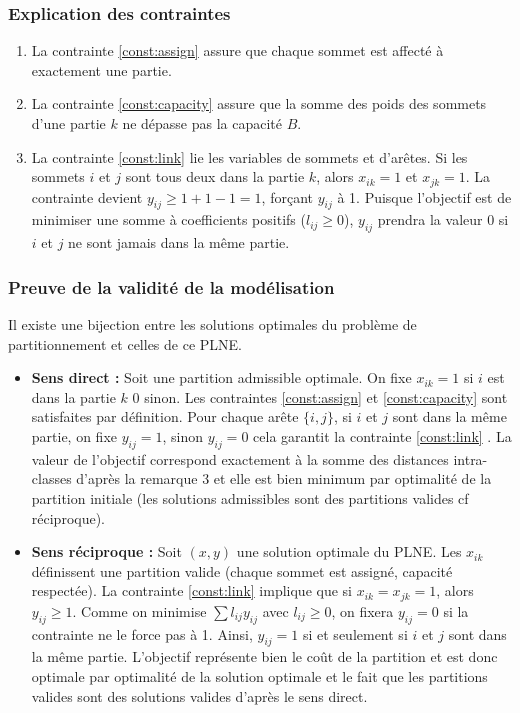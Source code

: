 \documentclass{article}
\begin{document}
\subsubsection*{Explication des contraintes}
\begin{enumerate}
    \item La contrainte \eqref{const:assign} assure que chaque sommet est affecté à exactement une partie.
    \item La contrainte \eqref{const:capacity} assure que la somme des poids des sommets d'une partie $k$ ne dépasse pas la capacité $B$.
    \item La contrainte \eqref{const:link} lie les variables de sommets et d'arêtes. Si les sommets $i$ et $j$ sont tous deux dans la partie $k$, alors $x_{ik}=1$ et $x_{jk}=1$. La contrainte devient $y_{ij} \ge 1 + 1 - 1 = 1$, forçant $y_{ij}$ à 1. Puisque l'objectif est de minimiser une somme à coefficients positifs ($l_{ij} \ge 0$), $y_{ij}$ prendra la valeur 0 si $i$ et $j$ ne sont jamais dans la même partie.
\end{enumerate}

\subsubsection*{Preuve de la validité de la modélisation}
Il existe une bijection entre les solutions optimales du problème de partitionnement et celles de ce PLNE.
\begin{itemize}
    \item \textbf{Sens direct :} Soit une partition admissible optimale. On fixe $x_{ik}=1$ si $i$ est dans la partie $k$ 0 sinon. Les contraintes \eqref{const:assign} et \eqref{const:capacity} sont satisfaites par définition. Pour chaque arête $\{i,j\}$, si $i$ et $j$ sont dans la même partie, on fixe $y_{ij}=1$, sinon $y_{ij}=0$ cela garantit la contrainte \eqref{const:link} . La valeur de l'objectif correspond exactement à la somme des distances intra-classes d'après la remarque 3 et elle est bien minimum par optimalité de la partition initiale (les solutions admissibles sont des partitions valides cf réciproque).
    \item \textbf{Sens réciproque :} Soit $(x, y)$ une solution optimale du PLNE. Les $x_{ik}$ définissent une partition valide (chaque sommet est assigné, capacité respectée).
    La contrainte \eqref{const:link} implique que si $x_{ik}=x_{jk}=1$, alors $y_{ij} \ge 1$. Comme on minimise $\sum l_{ij} y_{ij}$ avec $l_{ij} \ge 0$, on fixera $y_{ij}=0$ si la contrainte ne le force pas à 1. Ainsi, $y_{ij}=1$ si et seulement si $i$ et $j$ sont dans la même partie. L'objectif représente bien le coût de la partition et est donc optimale par optimalité de la solution optimale et le fait que les partitions valides sont des solutions valides d'après le sens direct.
\end{itemize}
\end{document}
